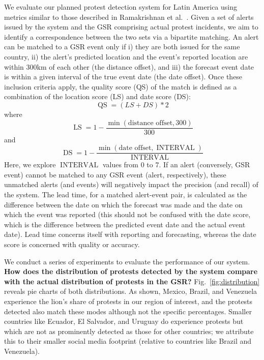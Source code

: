 \documentclass[letterpaper]{article}
\begin{document}
We evaluate our planned protest detection system for Latin America using
metrics similar to those described in Ramakrishnan et
al.~.  Given a set of alerts issued by the system
and the GSR comprising actual protest incidents, we aim to identify a
correspondence between the two sets via a bipartite matching.  An alert
can be matched to a GSR event only if i) they are both issued for the
same country, ii) the alert's predicted location and the event's
reported location are within 300km of each other (the distance offset),
and iii) the forecast event date is within a given interval of the true
event date (the date offset).  Once these inclusion criteria apply, the
quality score (QS) of the match is defined as a combination of the
location score (LS) and date score (DS):
\small
\begin{equation}
    \operatorname{QS}= (LS + DS)*2
\end{equation}
\normalsize
\noindent
where
\small
\begin{equation}
    \operatorname{LS}=1 - \frac{\min(\textrm{distance offset}, 300)}{300}
\end{equation}
and 
\begin{equation}
    \operatorname{DS}=1 - \frac{\min(\textrm{date offset}, \operatorname{INTERVAL})}{\operatorname{INTERVAL}}
\end{equation}
\normalsize
Here, we explore $\operatorname{INTERVAL}$ values from $0$ to $7$.  If
an alert (conversely, GSR event) cannot be matched to any GSR event
(alert, respectively), these unmatched alerts (and events) will
negatively impact the precision (and recall) of the system. The lead
time, for a matched alert-event pair, is calculated as the difference
between the date on which the forecast was made and the date on which
the event was reported (this should not be confused with the date score,
which is the difference between the predicted event date and the actual
event date). Lead time concerns itself with reporting and forecasting,
whereas the date score is concerned with quality or accuracy.

We conduct a series of experiments to evaluate the performance of our
system.\\

\noindent
{\bf How does the distribution of protests detected by the system
compare with the actual distribution of protests in the GSR?}
Fig.~\ref{fig:distribution} reveals pie charts of both distributions. As
shown, Mexico, Brazil, and Venezuela experience the lion's share of
protests in our region of interest, and the protests detected also match
these modes although not the specific percentages. Smaller countries
like Ecuador, El Salvador, and Uruguay do experience protests but which
are not as prominently detected as those for other countries; we
attribute this to their smaller social media footprint (relative to
countries like Brazil and Venezuela).\\
\end{document}

